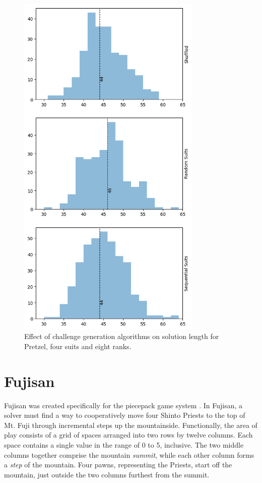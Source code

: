 \documentclass[journal]{IEEEtran}
\begin{document}
\begin{figure}[t]
\includegraphics[width=8.8cm]{pretzel48lengthhist.png}
\caption{Effect of challenge generation algorithms on solution length for Pretzel, four suits and eight ranks.}
\label{fig:pretzelfullsolve}
\end{figure}


\section{Fujisan}

Fujisan was created specifically for the piecepack game system \cite{GAMESYSTEM}. In Fujisan, a solver must find a way to cooperatively move four Shinto Priests to the top of Mt. Fuji through incremental steps up the mountainside. Functionally, the area of play consists of a grid of spaces arranged into two rows by twelve columns. Each space contains a single value in the range of 0 to 5, inclusive. The two middle columns together comprise the mountain {\it summit}, while each other column forms a {\it step} of the mountain. Four pawns, representing the Priests, start off the mountain, just outside the two columns furthest from the summit.
\end{document}
